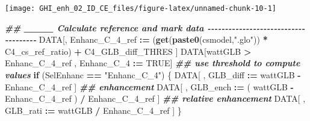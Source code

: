 \documentclass[
  10pt,
  a4paper,oneside]{article}
\newenvironment{Shaded}{\begin{snugshade}}{\end{snugshade}}
\newcommand{\ConstantTok}[1]{\textcolor[rgb]{0.56,0.35,0.01}{#1}}
\newcommand{\ControlFlowTok}[1]{\textcolor[rgb]{0.13,0.29,0.53}{\textbf{#1}}}
\newcommand{\DocumentationTok}[1]{\textcolor[rgb]{0.56,0.35,0.01}{\textbf{\textit{#1}}}}
\newcommand{\FunctionTok}[1]{\textcolor[rgb]{0.13,0.29,0.53}{\textbf{#1}}}
\newcommand{\NormalTok}[1]{#1}
\newcommand{\SpecialCharTok}[1]{\textcolor[rgb]{0.81,0.36,0.00}{\textbf{#1}}}
\newcommand{\StringTok}[1]{\textcolor[rgb]{0.31,0.60,0.02}{#1}}
\begin{document}
\begin{center}\texttt{[image: GHI\_enh\_02\_ID\_CE\_files/figure-latex/unnamed-chunk-10-1]} \end{center}

\begin{Shaded}
\begin{Highlighting}[]
\DocumentationTok{\#\# \_\_\_\_ Calculate reference and mark data  {-}{-}{-}{-}{-}{-}{-}{-}{-}{-}{-}{-}{-}{-}{-}{-}{-}{-}{-}{-}{-}{-}{-}{-}{-}{-}{-}{-}{-}{-}{-}{-}{-}{-}{-}{-}{-}}
\NormalTok{DATA[, Enhanc\_C\_4\_ref }\SpecialCharTok{:=}\NormalTok{ (}\FunctionTok{get}\NormalTok{(}\FunctionTok{paste0}\NormalTok{(csmodel,}\StringTok{".glo"}\NormalTok{)) }\SpecialCharTok{*}\NormalTok{ C4\_cs\_ref\_ratio) }\SpecialCharTok{+}\NormalTok{ C4\_GLB\_diff\_THRES ]}
\NormalTok{DATA[wattGLB }\SpecialCharTok{\textgreater{}}\NormalTok{ Enhanc\_C\_4\_ref ,}
\NormalTok{     Enhanc\_C\_4 }\SpecialCharTok{:=} \ConstantTok{TRUE}\NormalTok{]}
\DocumentationTok{\#\# use threshold to compute values}
\ControlFlowTok{if}\NormalTok{ (SelEnhanc }\SpecialCharTok{==} \StringTok{"Enhanc\_C\_4"}\NormalTok{) \{}
\NormalTok{    DATA[ , GLB\_diff }\SpecialCharTok{:=}\NormalTok{   wattGLB }\SpecialCharTok{{-}}\NormalTok{ Enhanc\_C\_4\_ref                    ] }\DocumentationTok{\#\# enhancement}
\NormalTok{    DATA[ , GLB\_ench }\SpecialCharTok{:=}\NormalTok{ ( wattGLB }\SpecialCharTok{{-}}\NormalTok{ Enhanc\_C\_4\_ref ) }\SpecialCharTok{/}\NormalTok{ Enhanc\_C\_4\_ref ] }\DocumentationTok{\#\# relative enhancement}
\NormalTok{    DATA[ , GLB\_rati }\SpecialCharTok{:=}\NormalTok{   wattGLB }\SpecialCharTok{/}\NormalTok{ Enhanc\_C\_4\_ref                    ]}
\NormalTok{\}}



\end{Highlighting}
\end{Shaded}
\end{document}
